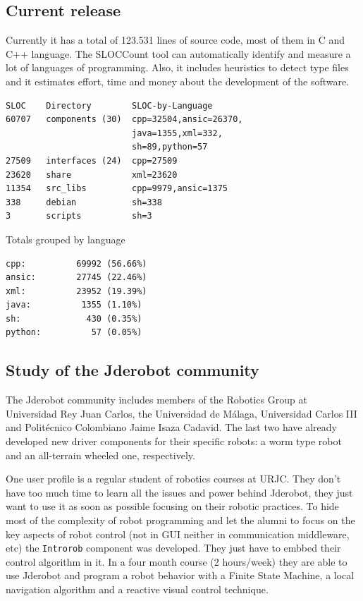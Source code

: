 \documentclass[twocolumn]{svjour3}          %
\begin{document}
\subsection{Current release}
Currently it has a total of 123.531 lines of source code, most of them
in C and C++ language. The SLOCCount tool can automatically identify
and measure a lot of languages of programming. Also, it includes
heuristics to detect type files and it estimates effort, time and
money about the development of the software.

\begin{verbatim}
SLOC    Directory        SLOC-by-Language 
60707   components (30)  cpp=32504,ansic=26370,
                         java=1355,xml=332,
                         sh=89,python=57
27509   interfaces (24)  cpp=27509
23620   share            xml=23620
11354   src_libs         cpp=9979,ansic=1375
338     debian           sh=338
3       scripts          sh=3
\end{verbatim}

Totals grouped by language
\begin{verbatim}
cpp:          69992 (56.66%)
ansic:        27745 (22.46%)
xml:          23952 (19.39%)
java:          1355 (1.10%)
sh:             430 (0.35%)
python:          57 (0.05%)
\end{verbatim}

\subsection{Study of the Jderobot community}
The Jderobot community includes members of the Robotics Group at Universidad Rey Juan Carlos, the Universidad de Málaga, Universidad Carlos III and Politécnico Colombiano Jaime Isaza Cadavid. The last two have already developed new driver components for their specific robots: a worm type robot and an all-terrain wheeled one, respectively.

One user profile is a regular student of robotics courses at URJC. They don't have too much time to learn all the issues and power behind Jderobot, they just want to use it as soon as possible focusing on their robotic practices. To hide most of the complexity of robot programming and let the alumni to focus on the key aspects of robot control (not in GUI neither in communication middleware, etc) the \texttt{Introrob} component was developed. They just have to embbed their control algorithm in it. In a four month course (2 hours/week) they are able to use Jderobot and program a robot behavior with a Finite State Machine, a local navigation algorithm and a reactive visual control technique. 
\end{document}

